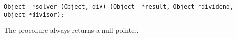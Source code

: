 
\tt{Object_ *solver_(Object, div)%
(Object_ *result, Object *dividend, Object *divisor);}


The procedure always returns a null pointer.
